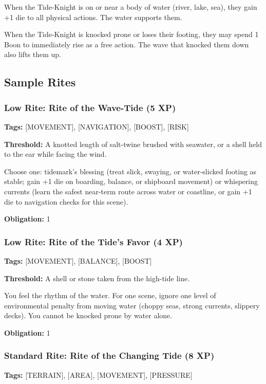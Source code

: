 When the Tide-Knight is on or near a body of water (river, lake, sea), they gain +1 die to all physical actions. The water supports them.

When the Tide-Knight is knocked prone or loses their footing, they may spend 1 Boon to immediately rise as a free action. The wave that knocked them down also lifts them up.

\subsection{Sample Rites}

\subsubsection{Low Rite: Rite of the Wave-Tide (5 XP)}

\textbf{Tags:} [MOVEMENT], [NAVIGATION], [BOOST], [RISK]

\textbf{Threshold:} A knotted length of salt-twine brushed with seawater, or a shell held to the ear while facing the wind.

Choose one: tidemark's blessing (treat slick, swaying, or water-slicked footing as stable; gain +1 die on boarding, balance, or shipboard movement) or whispering currents (learn the safest near-term route across water or coastline, or gain +1 die to navigation checks for this scene).

\textbf{Obligation:} 1

\subsubsection{Low Rite: Rite of the Tide's Favor (4 XP)}

\textbf{Tags:} [MOVEMENT], [BALANCE], [BOOST]

\textbf{Threshold:} A shell or stone taken from the high-tide line.

You feel the rhythm of the water. For one scene, ignore one level of environmental penalty from moving water (choppy seas, strong currents, slippery decks). You cannot be knocked prone by water alone.

\textbf{Obligation:} 1

\subsubsection{Standard Rite: Rite of the Changing Tide (8 XP)}

\textbf{Tags:} [TERRAIN], [AREA], [MOVEMENT], [PRESSURE]

